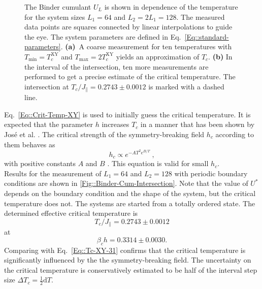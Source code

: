 		\begin{figure}[tb]
			\begin{subfigure}{0.475\textwidth}
				\centering
				
			\end{subfigure}
			\begin{subfigure}{0.475\textwidth}
				\centering
				
			\end{subfigure}
			\caption{The Binder cumulant $U_L$ is shown in dependence of the temperature for the system sizes $L_1 =	64$ and $L_2 =	2 L_1 =	128$. The measured data points are squares connected by linear interpolations to guide the eye. The system parameters are defined in Eq.~\eqref{Eq::standard-parameters}. \textbf{(a)}~A coarse measurement for ten temperatures with $T_{\text{min}} =	T_c^{\text{XY}}$ and $T_{\text{max}} =	2T_c^{\text{XY}}$ yields an approximation of $T_c$. \textbf{(b)} In the interval of the intersection, ten more measurements are performed to get a precise estimate of the critical temperature. The intersection at $T_c /	J_\parallel =	0.2743 \pm 0.0012$ is marked with a dashed line.}
			\label{Fig::Binder-Cum-Intersection}
		\end{figure}
	
		Eq.~\eqref{Eq::Crit-Temp-XY} is used to initially guess the critical temperature. It is expected that the parameter $h$ increases $T_c$ in a manner that has been shown by José et al. \cite{jose1977renormalization}. The critical strength of the symmetry-breaking field $h_c$ according to them behaves as
		\begin{equation} \label{Eq::h_c-T-dependence}
			h_c \propto e^{-AT^2 e^{B/T}}~,
		\end{equation}
		with positive constants $A$ and $B$ . This equation is valid for small $h_c$. \\
		
		 Results for the measurement of $L_1 =	64$ and $L_2 =	128$ with periodic boundary conditions are shown in \autoref{Fig::Binder-Cum-Intersection}. Note that the value of $U^*$ depends on the boundary condition and the shape of the system, but the critical temperature does not.  The systems are started from a totally ordered state. The determined effective critical temperature is
		\begin{equation} \label{Eq::crit-temp-exp-values}
			T_c /	J_\parallel  = 0.2743 \pm 0.0012	
		\end{equation}
		at
		\begin{equation} \label{Eq::crit-h-exp-values}
			\beta_c h = 0.3314 \pm 0.0030.
		\end{equation}
		Comparing with Eq.~\eqref{Eq::Tc-XY-31} confirms that the critical temperature is significantly influenced by the the symmetry-breaking field. The uncertainty on the critical temperature is conservatively estimated to be half of the interval step size $\Delta T_c =	\tfrac{1}{2} \text{d}T$. \\
		
